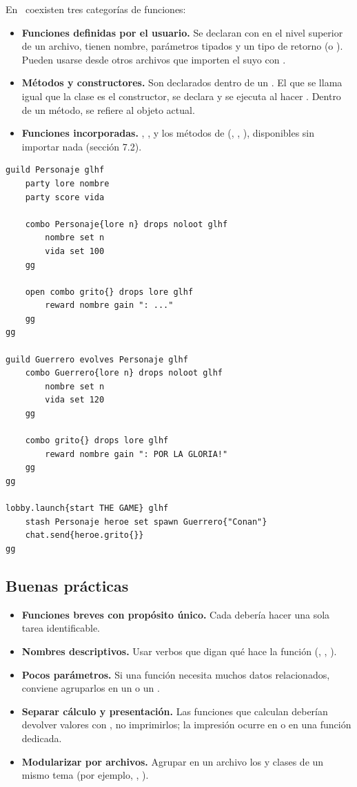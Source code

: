 En \ggez\ coexisten tres categorías de funciones:

\begin{itemize}
  \item \textbf{Funciones definidas por el usuario.} Se declaran con  en el nivel superior de un archivo, tienen nombre, parámetros tipados y un tipo de retorno (o ). Pueden usarse desde otros archivos que importen el suyo con .
  \item \textbf{Métodos y constructores.} Son  declarados dentro de un . El que se llama igual que la clase es el constructor, se declara  y se ejecuta al hacer . Dentro de un método,  se refiere al objeto actual.
  \item \textbf{Funciones incorporadas.} , ,  y los métodos de  (, , ), disponibles sin importar nada (sección 7.2).
\end{itemize}

\begin{lstlisting}
guild Personaje glhf
    party lore nombre
    party score vida

    combo Personaje{lore n} drops noloot glhf
        nombre set n
        vida set 100
    gg

    open combo grito{} drops lore glhf
        reward nombre gain ": ..."
    gg
gg

guild Guerrero evolves Personaje glhf
    combo Guerrero{lore n} drops noloot glhf
        nombre set n
        vida set 120
    gg

    combo grito{} drops lore glhf
        reward nombre gain ": POR LA GLORIA!"
    gg
gg

lobby.launch{start THE GAME} glhf
    stash Personaje heroe set spawn Guerrero{"Conan"}
    chat.send{heroe.grito{}}
gg
\end{lstlisting}

\subsection{Buenas prácticas}

\begin{itemize}
  \item \textbf{Funciones breves con propósito único.} Cada  debería hacer una sola tarea identificable.
  \item \textbf{Nombres descriptivos.} Usar verbos que digan qué hace la función (, , ).
  \item \textbf{Pocos parámetros.} Si una función necesita muchos datos relacionados, conviene agruparlos en un  o un .
  \item \textbf{Separar cálculo y presentación.} Las funciones que calculan deberían devolver valores con , no imprimirlos; la impresión ocurre en  o en una función dedicada.
  \item \textbf{Modularizar por archivos.} Agrupar en un archivo los  y clases de un mismo tema (por ejemplo, , ).
\end{itemize}


